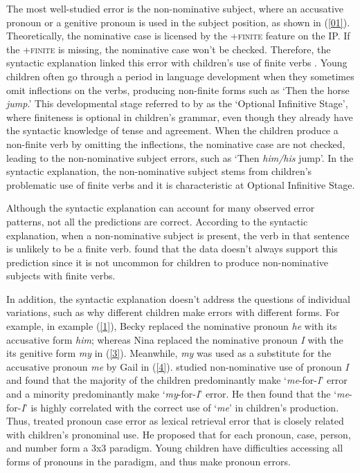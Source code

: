 The most well-studied error is the non-nominative subject, where an accusative pronoun or a genitive pronoun is used in the subject position, as shown in (\ref{01}). Theoretically, the nominative case is licensed by the +\textsc{finite} feature on the IP. If the +\textsc{finite} is missing, the nominative case won't be checked. Therefore, the syntactic explanation linked this error with children's use of finite verbs \citep[e.g.][]{vainikka1993case,wexler1996, schutze1996subject}. Young children often go through a period in language development when they sometimes omit inflections on the verbs, producing non-finite forms such as `Then the horse \textit{jump}.' This developmental stage referred to by \cite{wexler1994,wexler1998,wexler2000} as the `Optional Infinitive Stage', where finiteness is optional in children's grammar, even though they already have the syntactic knowledge of tense and agreement. When the children produce a non-finite verb by omitting the inflections, the nominative case are not checked, leading to the non-nominative subject errors, such as `Then \textit{him/his} jump'. In the syntactic explanation, the non-nominative subject stems from children's problematic use of finite verbs and it is characteristic at Optional Infinitive Stage.

Although the syntactic explanation can account for many observed error patterns, not all the predictions are correct. According to the syntactic explanation, when a non-nominative subject is present, the verb in that sentence is unlikely to be a finite verb. \cite{pine2005testing} found that the data doesn't always support this prediction since it is not uncommon for children to produce non-nominative subjects with finite verbs. 

In addition, the syntactic explanation doesn't address the questions of individual variations, such as why different children make errors with different forms. For example, in example (\ref{1}), Becky replaced the nominative pronoun \textit{he} with its accusative form \textit{him}; whereas Nina replaced the nominative pronoun \textit{I} with the its genitive form \textit{my} in (\ref{3}). Meanwhile, \textit{my} was used as a substitute for the accusative pronoun \textit{me} by Gail in (\ref{4}).  \cite{rispoli1998} studied non-nominative use of pronoun \textit{I} and found that the majority of the children predominantly make `\textit{me}-for-\textit{I}' error and a minority predominantly make `\textit{my}-for-\textit{I}' error. He then found that the `\textit{me}-for-\textit{I}' is highly correlated with the correct use of `\textit{me}' in children's production. Thus, \cite{rispoli1998,rispoli1999,rispoli2005} treated pronoun case error as lexical retrieval error that is closely related with children's pronominal use. He proposed that for each pronoun, case, person, and number form a 3x3 paradigm. Young children have difficulties accessing all forms of pronouns in the paradigm, and thus make pronoun errors. 




